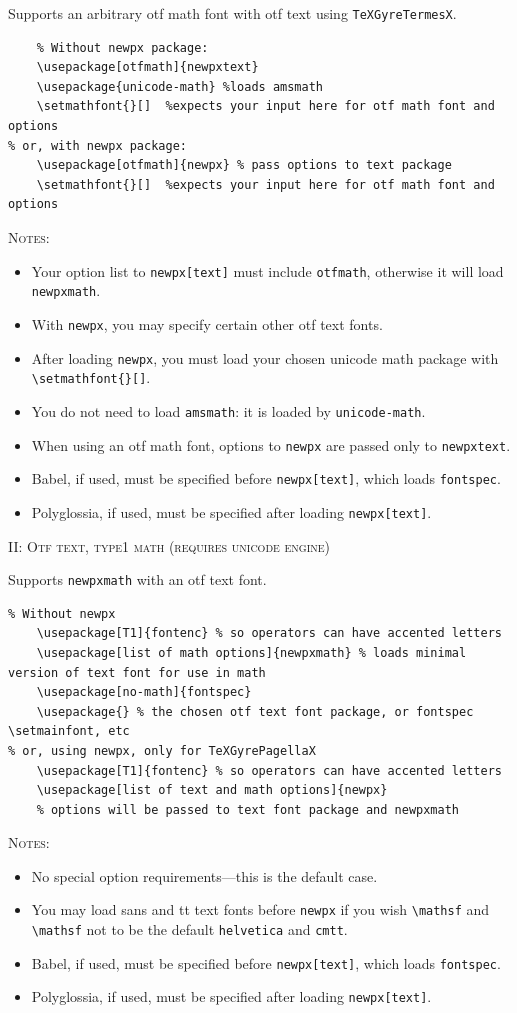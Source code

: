 \documentclass[11pt]{article}
\theoremstyle{oldplain}
\theoremstyle{plain}
\begin{document}
Supports an arbitrary otf math font with otf text using {\tt TeXGyreTermesX}.
\begin{verbatim}
	% Without newpx package:
    \usepackage[otfmath]{newpxtext}
    \usepackage{unicode-math} %loads amsmath
    \setmathfont{}[]  %expects your input here for otf math font and options
% or, with newpx package:
    \usepackage[otfmath]{newpx} % pass options to text package
    \setmathfont{}[]  %expects your input here for otf math font and options
\end{verbatim}
\textsc{Notes:}
\begin{itemize}
\item Your option list to {\tt newpx[text]} must include {\tt otfmath}, otherwise it will load {\tt newpxmath}. 
\item With {\tt newpx}, you may specify certain other otf text fonts.
\item After loading {\tt newpx}, you must load your chosen unicode math package with \verb|\setmathfont{}[]|.
\item
You do not need to load {\tt amsmath}: it is loaded by {\tt unicode-math}.
\item When using an otf math font, options to {\tt newpx} are passed only to {\tt newpxtext}.

\item Babel, if used, must be specified before {\tt newpx[text]}, which loads {\tt fontspec}.
\item Polyglossia, if used, must be specified after loading {\tt newpx[text]}.
\end{itemize}

\textsc{II: Otf text, type1 math (requires unicode engine)}

Supports  {\tt newpxmath} with an otf text font.
\begin{verbatim}
% Without newpx
    \usepackage[T1]{fontenc} % so operators can have accented letters
    \usepackage[list of math options]{newpxmath} % loads minimal version of text font for use in math 
    \usepackage[no-math]{fontspec}
    \usepackage{} % the chosen otf text font package, or fontspec \setmainfont, etc
% or, using newpx, only for TeXGyrePagellaX
    \usepackage[T1]{fontenc} % so operators can have accented letters
    \usepackage[list of text and math options]{newpx} 
    % options will be passed to text font package and newpxmath
\end{verbatim}
\textsc{Notes:}
\begin{itemize}
\item No special option requirements---this is the default case.
\item You may load sans and tt text fonts before {\tt newpx} if you wish \verb|\mathsf| and \verb|\mathsf| not to be the default {\tt helvetica} and {\tt cmtt}.
\item Babel, if used, must be specified before {\tt newpx[text]}, which loads {\tt fontspec}.
\item Polyglossia, if used, must be specified after loading {\tt newpx[text]}.
\end{itemize}
\end{document}
